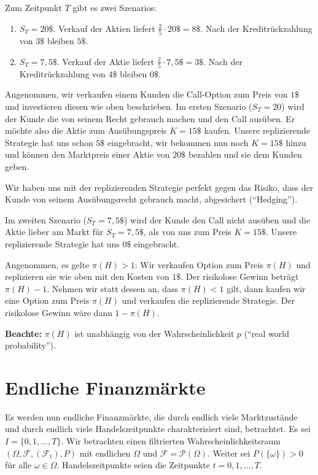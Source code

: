 \documentclass[a4paper,twoside,DIV15,BCOR12mm]{scrbook}
\newcommand{\cF}{\mathcal F}
\begin{document}
\begin{beispiel}
Zum Zeitpunkt $T$ gibt es zwei Szenarios:
\begin{enumerate}
\item $S_T=20\$$. Verkauf der Aktien liefert $\frac 25 \cdot 20\$ = 8\$$. Nach der Kreditrückzahlung von $3\$$ bleiben $5\$$.
\item $S_T=7,5\$$. Verkauf der Aktie liefert $\frac 25 \cdot 7,5\$ = 3\$$. Nach der Kreditrückzahlung von $4\$$ bleiben $0\$$.
\end{enumerate}

Angenommen, wir verkaufen einem Kunden die Call-Option zum Preis von $1\$$ und investieren diesen wie oben beschrieben. Im ersten Szenario ($S_T=20$) wird der Kunde die von seinem Recht gebrauch machen und den Call ausüben. Er möchte also die Aktie zum Ausübungspreis $K=15\$$ kaufen. Unsere replizierende Strategie hat uns schon $5\$$ eingebracht, wir bekommen nun noch $K=15\$$ hinzu und können den Marktpreis einer Aktie von $20\$$ bezahlen und sie dem Kunden geben.

Wir haben uns mit der replizierenden Strategie perfekt gegen das Risiko, dass der Kunde  von seinem Ausübungsrecht gebrauch macht, abgesichert (“Hedging”).

Im zweiten Szenario ($S_T=7,5\$$) wird der Kunde den Call nicht ausüben und die Aktie lieber am Markt für $S_T=7,5\$$, als von uns zum Preis $K=15\$$. Unsere replizierende Strategie hat uns $0\$$ eingebracht.

Angenommen, es gelte $\pi(H)>1$: Wir verkaufen Option zum Preis $\pi(H)$ und replizieren sie wie oben mit den Kosten von $1\$$. Der risikolose Gewinn beträgt $\pi(H) - 1$. Nehmen wir statt dessen an, dass $\pi(H)<1$ gilt, dann kaufen wir eine Option zum Preis $\pi(H)$ und verkaufen die replizierende Strategie. Der risikolose Gewinn wäre dann $1-\pi(H)$.

\textbf{Beachte:} $\pi(H)$ ist unabhängig von der Wahrscheinlichkeit $p$ (“real world probability”).
\end{beispiel}

\section{Endliche Finanzmärkte}
\label{sec:2.3}

Es werden nun endliche Finanzmärkte, die durch endlich viele Marktzustände und durch endlich viele Handelszeitpunkte charakterisiert sind, betrachtet. Es sei $I=\{0, 1,\ldots,T\}$. Wir betrachten einen filtrierten Wahrscheinlichkeitsraum $(\Omega,\cF,(\cF_t),P)$ mit endlichen $\Omega$ und $\cF=\mathcal P(\Omega)$. Weiter sei $P(\{\omega\})>0$ für alle $\omega\in\Omega$. Handelszeitpunkte seien die Zeitpunkte $t=0, 1,\ldots,T$.
\end{document}
